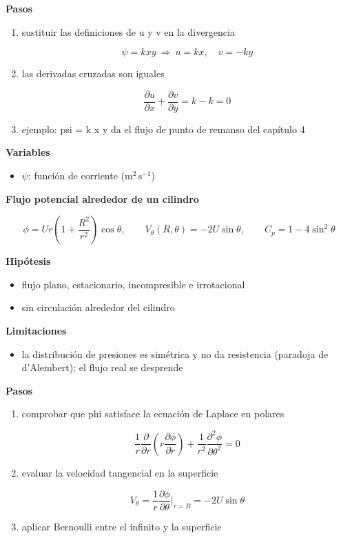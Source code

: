 \documentclass[10pt,openany]{book}
\begin{document}
\begin{tcolorbox}[title={Desarrollos del modelo}, studiumdef, breakable]
\noindent\textbf{Pasos}
\begin{enumerate}
\item
sustituir las definiciones de u y v en la divergencia

\[
\psi = k x y\ \Rightarrow\ u = k x,\quad v = -k y
\]
\item
las derivadas cruzadas son iguales

\[
\frac{\partial u}{\partial x} + \frac{\partial v}{\partial y} = k - k = 0
\]
\item
ejemplo: psi = k x y da el flujo de punto de remanso del capítulo 4
\end{enumerate}

\noindent\textbf{Variables}
\begin{itemize}
\item $\psi$: función de corriente ($\mathrm{m}^{2}\,\mathrm{s}^{-1}$)
\end{itemize}



\noindent\textbf{Flujo potencial alrededor de un cilindro}

\[
\phi = U r\left(1 + \frac{R^{2}}{r^{2}}\right)\cos\theta,\qquad V_\theta(R,\theta) = -2U\sin\theta,\qquad C_p = 1 - 4\sin^{2}\theta
\]

\noindent\textbf{Hipótesis}
\begin{itemize}
\item flujo plano, estacionario, incompresible e irrotacional
\item sin circulación alrededor del cilindro
\end{itemize}

\noindent\textbf{Limitaciones}
\begin{itemize}
\item la distribución de presiones es simétrica y no da resistencia (paradoja de d'Alembert); el flujo real se desprende
\end{itemize}

\noindent\textbf{Pasos}
\begin{enumerate}
\item
comprobar que phi satisface la ecuación de Laplace en polares

\[
\frac{1}{r}\frac{\partial}{\partial r}\left(r\frac{\partial\phi}{\partial r}\right) + \frac{1}{r^{2}}\frac{\partial^{2}\phi}{\partial\theta^{2}} = 0
\]
\item
evaluar la velocidad tangencial en la superficie

\[
V_\theta = \frac{1}{r}\frac{\partial\phi}{\partial\theta}\Big|_{r=R} = -2U\sin\theta
\]
\item
aplicar Bernoulli entre el infinito y la superficie


\end{enumerate}
\end{tcolorbox}
\end{document}

